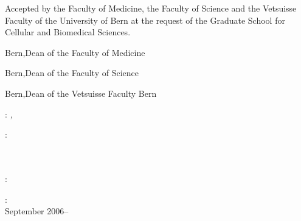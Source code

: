 \thispagestyle{empty}
\noindent Accepted by the Faculty of Medicine, the Faculty of Science and the Vetsuisse Faculty of the University of Bern at the request of the Graduate School for Cellular and Biomedical Sciences.

\vspace{2.5cm}
\noindent Bern,\hfill Dean of the Faculty of Medicine

\vspace{2.5cm}
\noindent Bern,\hfill Dean of the Faculty of Science

\vspace{2.5cm}
\noindent Bern,\hfill Dean of the Vetsuisse Faculty Bern\\
\vfill

\noindent\myName: \textit{\myTitle,} \myDegree

\bigskip
\noindent{}:\\
\myProf \\
\myOtherProf \\ 
\mySupervisor

\medskip

\noindent{}:\\
\noindent\myLocation

\medskip
\noindent{}:\\
September 2006--\myTime
